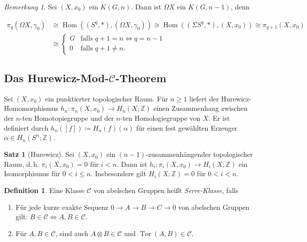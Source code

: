 \documentclass[11pt, a4paper, german]{article}
\theoremstyle{definition}
\newtheorem{satz}{Satz}
\newtheorem{defn}{Definition}
\theoremstyle{remark}
\newtheorem*{bem}{Bemerkung}
\newcommand{\Z}{\mathbb{Z}} %
\DeclareMathOperator{\Hom}{Hom} %
\DeclareMathOperator{\Tor}{Tor} %
\newcommand{\SC}{\mathcal{C}} %
\renewcommand{\dh}{d.\,h.} %
\begin{document}

\begin{bem}
  Sei $(X, x_0)$ ein $K(G, n)$. Dann ist $\Omega X$ ein $K(G, n-1)$, denn

  \begin{align*}
    \pi_q(\Omega X, \gamma_0) & \cong \Hom((S^q, *), (\Omega X, \gamma_0))
    \cong \Hom((\Sigma S^q, *), (X, x_0))
    \cong \pi_{q+1}(X, x_0) \\
    & \cong \begin{cases}
      G & \text{falls $q+1 = n \iff q = n-1$} \\
      0 & \text{falls $q+1 \neq n$.}
    \end{cases}
  \end{align*}
\end{bem}

\subsection{Das Hurewicz-Mod-$\SC$-Theorem}

Sei $(X, x_0)$ ein punktierter topologischer Raum.
Für $n \geq 1$ liefert der Hurewicz-Homomorphismus $h_n : \pi_n(X, x_0) \to H_n(X; \Z)$ einen Zusammenhang zwischen der $n$-ten Homotopiegruppe und der $n$-ten Homologiegruppe von $X$.
Er ist definiert durch $h_n([f]) \coloneqq H_n(f)(\alpha)$ für einen fest gewählten Erzeuger $\alpha \in H_n(S^n; \Z)$.

\begin{satz}[Hurewicz]
  Sei $(X, x_0)$ ein $(n{-}1)$-zusammenhängender topologischer Raum, \dh{} $\pi_i(X, x_0) = 0$ für $i < n$.
  Dann ist $h_i : \pi_i(X, x_0) \to H_i(X; \Z)$ ein Isomorphismus für $0 < i \leq n$.
  Insbesondere gilt $H_i(X; \Z) = 0$ für $0 < i < n$.
\end{satz}


\begin{defn}
  Eine Klasse $\SC$ von abelschen Gruppen heißt \emph{Serre-Klasse}, falls
  \begin{enumerate}
    \item Für jede kurze exakte Sequenz $0 \to A \to B \to C \to 0$ von abelschen Gruppen gilt: $B \in \SC \iff A, B \in \SC$.
    \item Für $A, B \in \SC$, sind auch $A \otimes B \in \SC$ und $\Tor(A, B) \in \SC$.
  \end{enumerate}
\end{defn}
\end{document}
